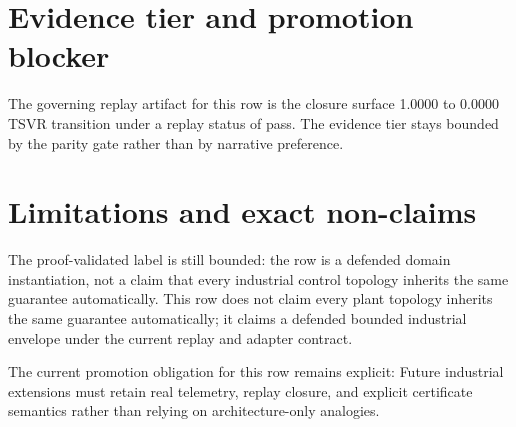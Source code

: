 \section{{Evidence tier and promotion blocker}}
The governing replay artifact for this row is the closure surface 1.0000 to 0.0000 TSVR transition under a replay status of pass. The evidence tier stays bounded by the parity gate rather than by narrative preference.



\section{{Limitations and exact non-claims}}
The proof-validated label is still bounded: the row is a defended domain instantiation, not a claim that every industrial control topology inherits the same guarantee automatically. This row does not claim every plant topology inherits the same guarantee automatically; it claims a defended bounded industrial envelope under the current replay and adapter contract.

The current promotion obligation for this row remains explicit: Future industrial extensions must retain real telemetry, replay closure, and explicit certificate semantics rather than relying on architecture-only analogies.
